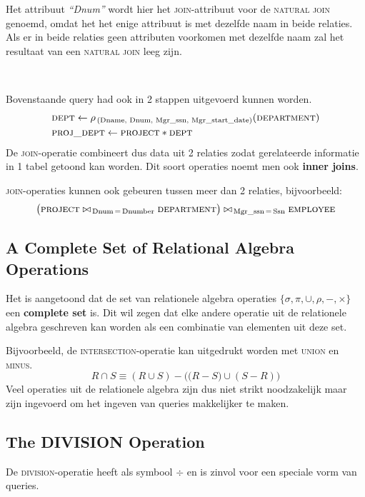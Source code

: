 Het attribuut \textit{``Dnum''} wordt hier het \textsc{join}-attribuut voor de \textsc{natural join} genoemd, omdat het het enige attribuut is met dezelfde naam in beide relaties. Als er in beide relaties geen attributen voorkomen met dezelfde naam zal het resultaat van een \textsc{natural join} leeg zijn.

~

\noindent Bovenstaande query had ook in 2 stappen uitgevoerd kunnen worden.
\vspace{-2mm}
\begin{align*}
& \textsc{dept} \leftarrow \rho_{\,\text{(Dname, Dnum, Mgr\_ssn, Mgr\_start\_date)}}(\textsc{department}) \\
& \textsc{proj\_dept} \leftarrow \textsc{project} * \textsc{dept}
\end{align*}
De \textsc{join}-operatie combineert dus data uit 2 relaties zodat gerelateerde informatie in 1 tabel getoond kan worden. Dit soort operaties noemt men ook \textbf{inner joins}.

\textsc{join}-operaties kunnen ook gebeuren tussen meer dan 2 relaties, bijvoorbeeld:
\vspace{-2mm}
\[ \big( \textsc{project} \bowtie_{\,\text{Dnum} \,=\, \text{Dnumber}} \textsc{department} \big) \bowtie_{\,\text{Mgr\_ssn} \,=\, \text{Ssn}} \textsc{employee} \]


\subsection{A Complete Set of Relational Algebra Operations}
Het is aangetoond dat de set van relationele algebra operaties $\{\sigma,\pi,\cup,\rho,-,\times\}$ een \textbf{complete set} is. Dit wil zegen dat elke andere operatie uit de relationele algebra geschreven kan worden als een combinatie van elementen uit deze set.

Bijvoorbeeld, de \textsc{intersection}-operatie kan uitgedrukt worden met \textsc{union} en \textsc{minus}.
\vspace{-2mm}
\[ R \cap S \equiv (R \cup S) - \big( \big(R-S) \cup (S-R) \big) \]
Veel operaties uit de relationele algebra zijn dus niet strikt noodzakelijk maar zijn ingevoerd om het ingeven van queries makkelijker te maken.


\subsection{The DIVISION Operation}
De \textsc{division}-operatie heeft als symbool $\div$ en is zinvol voor een speciale vorm van queries.

